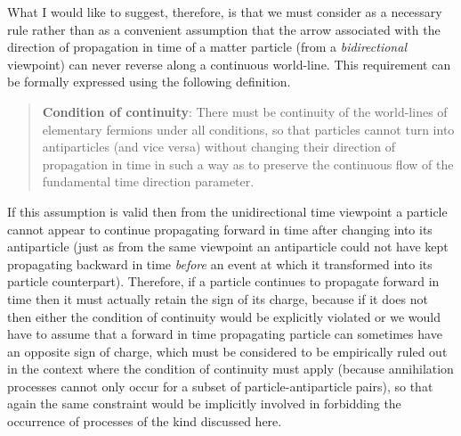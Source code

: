 \documentclass[notitlepage,12pt]{report}
\begin{document}
What I would like to suggest, therefore, is that we must consider as a necessary rule rather than as a convenient assumption that the arrow associated with the direction of propagation in time of a matter particle (from a \textit{bidirectional} viewpoint) can never reverse along a continuous world-line. This requirement can be formally expressed using the following definition.
\begin{quote}
\textbf{Condition of continuity}: There must be continuity of the world-lines of elementary fermions under all conditions, so that particles cannot turn into antiparticles (and vice versa) without changing their direction of propagation in time in such a way as to preserve the continuous flow of the fundamental time direction parameter.
\end{quote}
If this assumption is valid then from the unidirectional time viewpoint a particle cannot appear to continue propagating forward in time after changing into its antiparticle (just as from the same viewpoint an antiparticle could not have kept propagating backward in time \textit{before} an event at which it transformed into its particle counterpart). Therefore, if a particle continues to propagate forward in time then it must actually retain the sign of its charge, because if it does not then either the condition of continuity would be explicitly violated or we would have to assume that a forward in time propagating particle can sometimes have an opposite sign of charge, which must be considered to be empirically ruled out in the context where the condition of continuity must apply (because annihilation processes cannot only occur for a subset of particle-antiparticle pairs), so that again the same constraint would be implicitly involved in forbidding the occurrence of processes of the kind discussed here.
\end{document}
